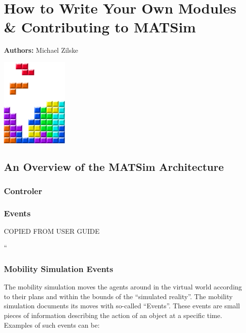 \chapter{How to Write Your Own Modules \& Contributing to MATSim }
\label{ch:extensionpoints}
\hfill \textbf{Authors:} Michael Zilske

\begin{center} \includegraphics[width=0.25\textwidth, angle=0]{figures/MATSimBook.png} \end{center}

\section{An Overview of the MATSim Architecture}
\subsection{Controler}

\subsection{Events}
\label{sec:events}

COPIED FROM USER GUIDE

``
\subsection{Mobility Simulation Events}

The mobility simulation moves the agents around in the virtual world according to their plans and within the bounds of the ``simulated reality''. The mobility simulation documents its moves with so-called ``Events''. These events are small pieces of information describing the action of an object at a specific time. Examples of such events can be:


